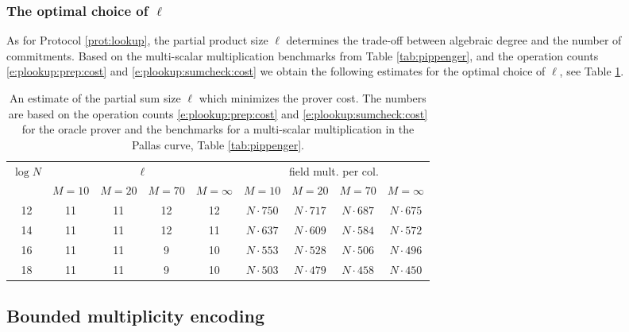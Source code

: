 \documentclass[11pt]{article}
\theoremstyle{definition}
\theoremstyle{definition}
\begin{document}
\subsubsection{The optimal choice of $\ell$}

As for Protocol \ref{prot:lookup}, the partial product size $\ell$ determines the trade-off between algebraic degree and the number of commitments.
Based on the multi-scalar multiplication benchmarks from Table \ref{tab:pippenger}, and the operation counts \eqref{e:plookup:prep:cost} and \eqref{e:plookup:sumcheck:cost} we obtain the following estimates for the optimal choice of $\ell$, see Table \ref{tab:plookup:optimal}.

\begin{table}[h!]
\caption{%
An estimate of the partial sum size $\ell$ which minimizes the prover cost. 
The numbers are based on the operation counts \eqref{e:plookup:prep:cost} and \eqref{e:plookup:sumcheck:cost} for the oracle prover and the benchmarks for a multi-scalar multiplication in the Pallas curve, Table \ref{tab:pippenger}.
}
\label{tab:plookup:optimal}
\vspace*{0.5cm}
\centering
\begin{tabular} {|c|c|c|c|c|c|c|c|c|}
\hline
\multirow{2}{*}{$\log N$} & \multicolumn{4}{c|}{$\ell$} & \multicolumn{4}{c|}{field mult. per col.} 
\\\cline{2-9}
& $M=10$ & $M=20$ & $M=70$ & $M=\infty$ & $M=10$ &$M=20$ & $M=70$ & $M=\infty$
\\\hline
12 & 11 & 11 & 12 & 12 & $N\cdot 750$ & $N\cdot 717$ &  $N\cdot 687$ &  $N\cdot 675$
\\
14 & 11 & 11 & 12 & 11 & $N\cdot 637$ & $N\cdot 609$ &  $N\cdot 584$ &  $N\cdot 572$
\\
16 & 11 &11 & 9 & 10 & $N\cdot 553$ & $N\cdot 528$ &  $N\cdot 506$&  $N\cdot 496$
\\
18 & 11 & 11 & 9 &  10 & $N\cdot 503$ & $N\cdot 479$  &  $N\cdot 458$ &  $N\cdot 450$
\\\hline
\end{tabular}
\end{table}

\subsection{Bounded multiplicity encoding}
\label{s:bounded:plookup}
\end{document}
